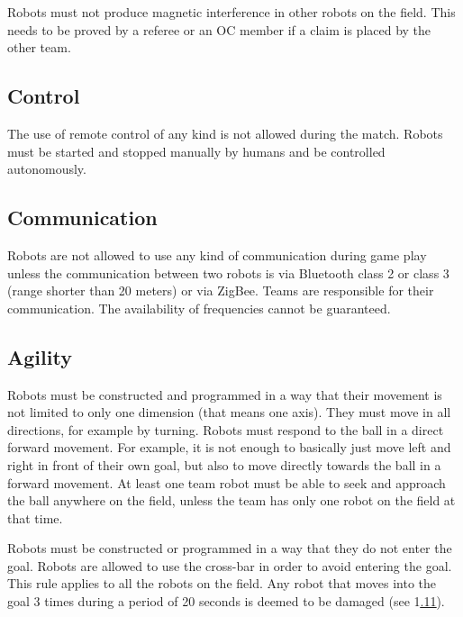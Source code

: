 \documentclass{article}
\begin{document}
Robots must not produce magnetic interference in other robots on the field. This needs to be proved by a referee or an OC member if a claim is placed by the other team.

\subsection{ Control \label{ref-021}}

The use of remote control of any kind is not allowed during the match. Robots must be started and stopped manually by humans and be controlled autonomously.

\subsection{ Communication \label{ref-022}}

Robots are not allowed to use any kind of communication during game play unless the communication between two robots is via Bluetooth class 2 or class 3 (range shorter than 20 meters) or via ZigBee. Teams are responsible for their communication. The availability of frequencies cannot be guaranteed.

\subsection{ Agility \label{ref-023}}

Robots must be constructed and programmed in a way that their movement is not limited to only one dimension (that means one axis). They must move in all directions, for example by turning. Robots must respond to the ball in a direct forward movement. For example, it is not enough to basically just move left and right in front of their own goal, but also to move directly towards the ball in a forward movement. At least one team robot must be able to seek and approach the ball anywhere on the field, unless the team has only one robot on the field at that time.

Robots must be constructed or programmed in a way that they do not enter the goal. Robots are allowed to use the cross-bar in order to avoid entering the goal. This rule applies to all the robots on the field. Any robot that moves into the goal 3 times during a period of 20 seconds is deemed to be damaged (see 1\underline{{\hyperref[ref-012]{.11}}}).
\end{document}
